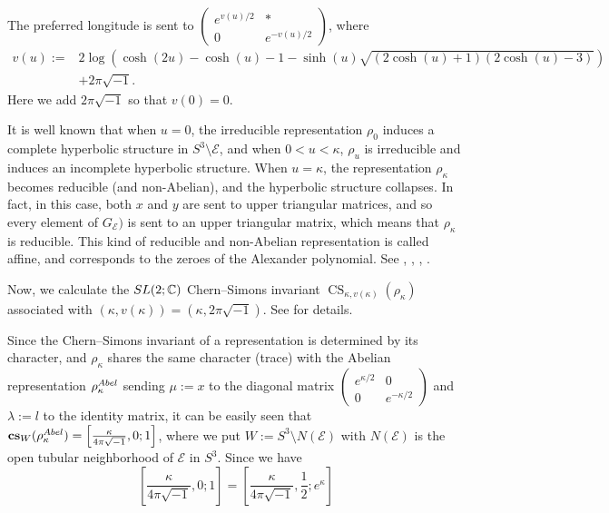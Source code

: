 \documentclass[a4paper,dvipdfmx]{amsart}
\theoremstyle{plain}
\theoremstyle{definition}
\theoremstyle{remark}
\newcommand{\C}{\mathbb{C}}
\newcommand{\CS}{\operatorname{CS}}
\newcommand{\cs}{\mathbf{cs}}
\newcommand{\SL}{\rm{SL}}
\newcommand{\FE}{\mathscr{E}}
\renewcommand{\i}{\sqrt{-1}}
\numberwithin{equation}{section}
\begin{document}
The preferred longitude is sent to $\begin{pmatrix}e^{v(u)/2}&\ast\\0&e^{-v(u)/2}\end{pmatrix}$,
where
\begin{equation*}
\begin{split}
  v(u)
  :=&
  2\log
  \left(
    \cosh(2u)-\cosh(u)-1
    -
    \sinh(u)\sqrt{(2\cosh(u)+1)(2\cosh(u)-3)}
  \right)
  \\
  &+2\pi\i.
\end{split}
\end{equation*}
Here we add $2\pi\i$ so that $v(0)=0$.
\par
It is well known \cite{Thurston:GT3M} that when $u=0$, the irreducible representation $\rho_{0}$ induces a complete hyperbolic structure in $S^3\setminus{\FE}$, and when $0<u<\kappa$, $\rho_{u}$ is irreducible and induces an incomplete hyperbolic structure.
When $u=\kappa$, the representation $\rho_{\kappa}$ becomes reducible (and non-Abelian), and the hyperbolic structure collapses.
In fact, in this case, both $x$ and $y$ are sent to upper triangular matrices, and so every element of $G_{\FE})$ is sent to an upper triangular matrix, which means that $\rho_{\kappa}$ is reducible.
This kind of reducible and non-Abelian representation is called affine, and corresponds to the zeroes of the Alexander polynomial.
See \cite{Burde:MATHA1967}, \cite{deRham:ENSEM21967}, \cite[Exercise~11.2]{Kauffman:Knots}, \cite[2.4.3. Corollary]{Le:RUSSM1993}.
\par
Now, we calculate the $\SL(2;\C)$ Chern--Simons invariant $\CS_{\kappa,v(\kappa)}(\rho_{\kappa})$ associated with $(\kappa,v(\kappa))=(\kappa,2\pi\i)$.
See \cite{Kirk/Klassen:COMMP1993} for details.
\par
Since the Chern--Simons invariant of a representation is determined by its character, and $\rho_{\kappa}$ shares the same character (trace) with the Abelian representation $\rho^{\rm{Abel}}_{\kappa}$ sending $\mu:=x$ to the diagonal matrix $\begin{pmatrix}e^{\kappa/2}&0\\0&e^{-\kappa/2}\end{pmatrix}$ and $\lambda:=l$ to the identity matrix, it can be easily seen that $\cs_{W}(\rho^{\rm{Abel}}_{\kappa})=\left[\frac{\kappa}{4\pi\i},0;1\right]$, where we put $W:=S^3\setminus{N(\FE)}$ with $N(\FE)$ is the open tubular neighborhood of $\FE$ in $S^3$.
Since we have
\begin{equation*}
  \left[\frac{\kappa}{4\pi\i},0;1\right]
  =
  \left[\frac{\kappa}{4\pi\i},\frac{1}{2};e^{\kappa}\right]
\end{equation*}
\end{document}
